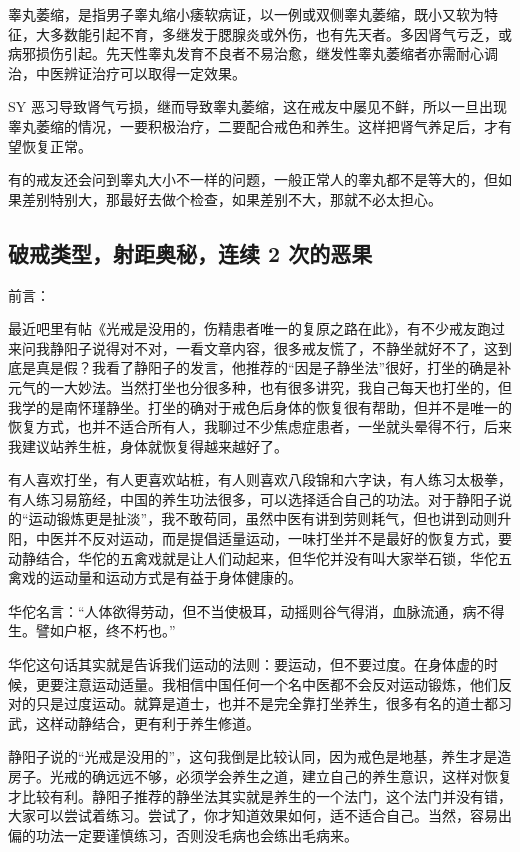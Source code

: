 \documentclass{ctexart}
\begin{document}
睾丸萎缩，是指男子睾丸缩小痿软病证，以一例或双侧睾丸萎缩，既小又软为特征，大多数能引起不育，多继发于腮腺炎或外伤，也有先天者。多因肾气亏乏，或病邪损伤引起。先天性睾丸发育不良者不易治愈，继发性睾丸萎缩者亦需耐心调治，中医辨证治疗可以取得一定效果。

SY 恶习导致肾气亏损，继而导致睾丸萎缩，这在戒友中屡见不鲜，所以一旦出现睾丸萎缩的情况，一要积极治疗，二要配合戒色和养生。这样把肾气养足后，才有望恢复正常。

有的戒友还会问到睾丸大小不一样的问题，一般正常人的睾丸都不是等大的，但如果差别特别大，那最好去做个检查，如果差别不大，那就不必太担心。

\subsection{破戒类型，射距奥秘，连续 2 次的恶果}

前言：

最近吧里有帖《光戒是没用的，伤精患者唯一的复原之路在此》，有不少戒友跑过来问我静阳子说得对不对，一看文章内容，很多戒友慌了，不静坐就好不了，这到底是真是假？我看了静阳子的发言，他推荐的“因是子静坐法”很好，打坐的确是补元气的一大妙法。当然打坐也分很多种，也有很多讲究，我自己每天也打坐的，但我学的是南怀瑾静坐。打坐的确对于戒色后身体的恢复很有帮助，但并不是唯一的恢复方式，也并不适合所有人，我聊过不少焦虑症患者，一坐就头晕得不行，后来我建议站养生桩，身体就恢复得越来越好了。

有人喜欢打坐，有人更喜欢站桩，有人则喜欢八段锦和六字诀，有人练习太极拳，有人练习易筋经，中国的养生功法很多，可以选择适合自己的功法。对于静阳子说的“运动锻炼更是扯淡”，我不敢苟同，虽然中医有讲到劳则耗气，但也讲到动则升阳，中医并不反对运动，而是提倡适量运动，一味打坐并不是最好的恢复方式，要动静结合，华佗的五禽戏就是让人们动起来，但华佗并没有叫大家举石锁，华佗五禽戏的运动量和运动方式是有益于身体健康的。

华佗名言：“人体欲得劳动，但不当使极耳，动摇则谷气得消，血脉流通，病不得生。譬如户枢，终不朽也。”

华佗这句话其实就是告诉我们运动的法则：要运动，但不要过度。在身体虚的时候，更要注意运动适量。我相信中国任何一个名中医都不会反对运动锻炼，他们反对的只是过度运动。就算是道士，也并不是完全靠打坐养生，很多有名的道士都习武，这样动静结合，更有利于养生修道。

静阳子说的“光戒是没用的”，这句我倒是比较认同，因为戒色是地基，养生才是造房子。光戒的确远远不够，必须学会养生之道，建立自己的养生意识，这样对恢复才比较有利。静阳子推荐的静坐法其实就是养生的一个法门，这个法门并没有错，大家可以尝试着练习。尝试了，你才知道效果如何，适不适合自己。当然，容易出偏的功法一定要谨慎练习，否则没毛病也会练出毛病来。
\end{document}
